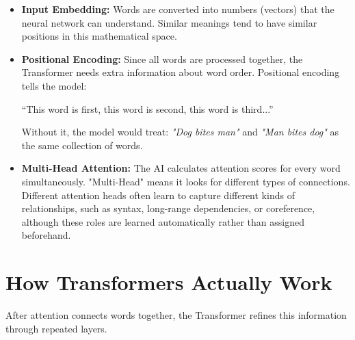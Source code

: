 \documentclass[11pt]{article}
\begin{document}
\vspace{0.05in}

\begin{itemize}[leftmargin=*, itemsep=0.08in]

    \item \textbf{Input Embedding:}  
    Words are converted into numbers (vectors) that the neural network can understand.  
    Similar meanings tend to have similar positions in this mathematical space.

    \item \textbf{Positional Encoding:}  
    Since all words are processed together, the Transformer needs extra information about word order.  
    Positional encoding tells the model:
    \begin{center}
        ``This word is first, this word is second, this word is third...''
    \end{center}
    Without it, the model would treat:
    \textit{"Dog bites man"} and \textit{"Man bites dog"} as the same collection of words.

    \item \textbf{Multi-Head Attention:} The AI calculates attention scores for every word simultaneously. "Multi-Head" means it looks for different types of connections. Different attention heads often learn to capture different kinds of relationships, such as syntax, long-range dependencies, or coreference, although these roles are learned automatically rather than assigned beforehand.


\end{itemize}

\section*{How Transformers Actually Work}

\vspace{0.05in}

After attention connects words together, the Transformer refines this information through repeated layers.

\vspace{0.1in}
\end{document}
